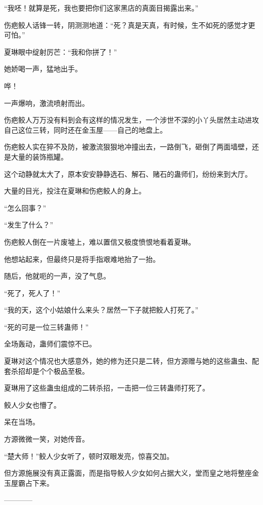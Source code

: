 \begin{this_body}
“我呸！就算是死，我也要把你们这家黑店的真面目揭露出来。”

伤疤鲛人话锋一转，阴测测地道：“死？真是天真，有时候，生不如死的感觉才更可怕。”

夏琳眼中绽射厉芒：“我和你拼了！”

她娇喝一声，猛地出手。

哗！

一声爆响，激流喷射而出。

伤疤鲛人万万没有料到会有这样的情况发生，一个涉世不深的小丫头居然主动进攻自己这位三转，同时还在金玉屋——自己的地盘上。

伤疤鲛人实在猝不及防，被激流狠狠地冲撞出去，一路倒飞，砸倒了两面墙壁，还是大量的装饰瓶罐。

这个动静就太大了，原本安安静静选石、解石、赌石的蛊师们，纷纷来到大厅。

大量的目光，投注在夏琳和伤疤鲛人的身上。

“怎么回事？”

“发生了什么？”

伤疤鲛人倒在一片废墟上，难以置信又极度愤恨地看着夏琳。

他想站起来，但最终只是将手指艰难地抬了一抬。

随后，他就呃的一声，没了气息。

“死了，死人了！”

“我的天，这个小姑娘什么来头？居然一下子就把鲛人打死了。”

“死的可是一位三转蛊师！”

全场轰动，蛊师们震惊不已。

夏琳对这个情况也大感意外，她的修为还只是二转，但方源赠与她的这些蛊虫、配套杀招却是个个极品至极。

夏琳用了这些蛊虫组成的二转杀招，一击把一位三转蛊师打死了。

鲛人少女也懵了。

呆在当场。

方源微微一笑，对她传音。

“楚大师！”鲛人少女听了，顿时双眼发亮，惊喜交加。

但方源施展没有真正露面，而是指导鲛人少女如何占据大义，堂而皇之地将整座金玉屋霸占下来。

------------

\end{this_body}

